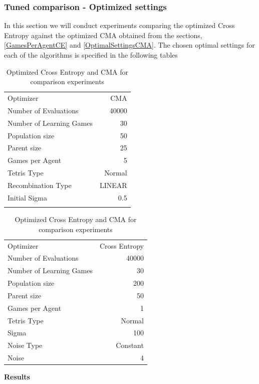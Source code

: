 \subsubsection{Tuned comparison - Optimized settings \label{tunedComparison}}
In this section we will conduct experiments comparing the optimized Cross Entropy against the
optimized CMA obtained from the sections, \ref{GamesPerAgentCE} and \ref{OptimalSettingsCMA}.
The chosen optimal settings for each of the algorithms is specified in the following tables
\begin{table}[h]
\centering
\begin{tabular}{l r}
Optimizer & CMA\\
Number of Evaluations & 40000\\
Number of Learning Games & 30\\
Population size& 50\\
Parent size & 25\\
Games per Agent & 5\\
Tetris Type & Normal\\
\hline
Recombination Type & LINEAR\\
Initial Sigma & 0.5\\
 & \\
\end{tabular}
\quad
\begin{tabular}{l r}
Optimizer & Cross Entropy\\
Number of Evaluations & 40000\\
Number of Learning Games & 30\\
Population size & 200\\
Parent size & 50\\
Games per Agent & 1\\
Tetris Type & Normal\\
\hline
Sigma & 100\\
Noise Type & Constant\\
Noise & 4
\end{tabular}
\caption{Optimized Cross Entropy and CMA for comparison experiments}
\end{table}

\textbf{Results}\\

